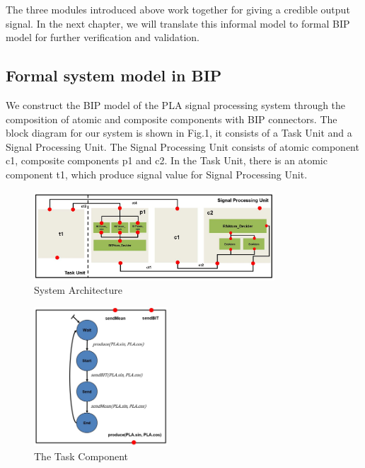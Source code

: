 The three modules introduced above work together for giving a credible output signal. In the next chapter, we will translate this informal model to formal BIP model for further verification and validation. 
\subsection{Formal system model in BIP}
We construct the BIP model of the PLA signal processing system through the composition of atomic and composite components with BIP connectors. The block diagram for our system is shown in Fig.1, it consists of a Task Unit and a Signal Processing Unit. The Signal Processing Unit consists of atomic component c1, composite components p1 and c2. In the Task Unit, there is an atomic component t1, which produce signal value for Signal Processing Unit.

\begin{figure}[ht!]
	\centering
	\includegraphics[width=90mm]{figure/figure2.jpg}
	\caption{System Architecture}
	\label{Sys_Model}
\end{figure}

\begin{figure}[ht!]
	\centering
	\includegraphics[width=50mm]{figure/figure3.jpg}
	\caption{The Task Component}
	\label{Task_Component}
\end{figure}

